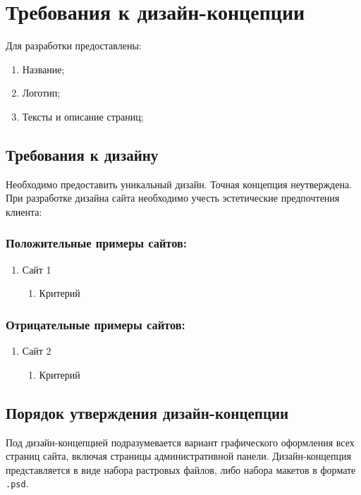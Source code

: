 \section{Требования к дизайн-концепции}
Для разработки предоставлены:
\begin{enumerate}
  \item Название;
  \item Логотип;
  \item Тексты и описание страниц;
\end{enumerate}

\subsection{Требования к дизайну}
  Необходимо предоставить уникальный дизайн. Точная концепция неутверждена.
  При разработке дизайна сайта необходимо учесть эстетические предпочтения клиента:
\subsubsection{Положительные примеры сайтов:}
\begin{enumerate}
  \item Сайт 1
  \begin{enumerate}
    \item Критерий
  \end{enumerate}
\end{enumerate}

\subsubsection{Отрицательные примеры сайтов:}
\begin{enumerate}
  \item Сайт 2
  \begin{enumerate}
    \item Критерий
  \end{enumerate}
\end{enumerate}

\subsection{Порядок утверждения дизайн-концепции}
Под дизайн-концепцией подразумевается вариант графического оформления всех страниц сайта, включая страницы административной панели. Дизайн-концепция представляется в виде набора растровых файлов, либо набора макетов в формате \texttt{.psd}.

